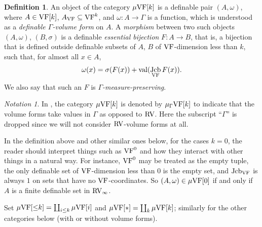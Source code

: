 \documentclass[12pt]{amsart}
\newcommand{\memph}[1]{{\color{magenta}\emph{#1}}}
\theoremstyle{plain}
\theoremstyle{definition}
\newtheorem{defn}[thm]{Definition}
\theoremstyle{remark}
\newtheorem{nota}[thm]{Notation}
\numberwithin{equation}{section}
\theoremstyle{plain}
\newcommand{\VF}{\textup{VF}}
\newcommand{\RV}{\textup{RV}}
\DeclareMathOperator{\jcb}{Jcb}
\newcommand{\0}{\emptyset}
\newcommand{\fun}{\longrightarrow}
\newcommand{\sub}{\subseteq}
\newcommand{\mVF}{{\mu}{\VF}}
\newcommand{\mgVF}{{\mu} {\VF}}
\DeclareMathOperator{\vv}{val}
\begin{document}
 \begin{defn}
\label{defn:VF:mu:G}
An object of the category $\mgVF[k]$ is a definable pair $(A, \omega)$, where $A \in \VF[k]$, $A_{\VF} \sub \VF^k$, and $\omega : A \fun \Gamma$ is a function, which is understood as a \memph{definable $\Gamma$-volume form} on $A$. A \memph{morphism} between two such objects $(A, \omega)$, $(B, \sigma)$ is a definable \memph{essential bijection} $F : A \fun B$, that is, a bijection that is defined outside definable subsets of $A$, $B$ of $\VF$-dimension less than $k$, such that, for almost all $x \in A$,
\begin{equation}\label{cond:mg}
\omega(x) = \sigma(F(x)) + \vv(\jcb_{\VF} F(x)).
\end{equation}
We also say that such an $F$ is \memph{$\Gamma$-measure-preserving}.
\end{defn}

\begin{nota}
In \cite{hrushovski:kazhdan:integration:vf}, the category $\mgVF[k]$ is denoted by ${\mu_{\Gamma}}{\VF[k]}$ to indicate that the volume forms take values in $\Gamma$ as opposed to $\RV$. Here the subscript ``$\Gamma$'' is dropped since  we will not consider $\RV$-volume forms at all.
\end{nota}

In the definition above and other similar ones below, for the cases $k =0$, the reader should interpret things such as $\VF^0$ and how they interact with other things in a natural way. For instance, $\VF^0$ may be treated as the empty tuple, the only definable set of $\VF$-dimension less than $0$ is the empty set, and $\jcb_{\VF}$ is always $1$ on sets that have no $\VF$-coordinates. So $(A, \omega) \in \mgVF[0]$ if and only if $A$ is a finite definable set in $\RV_\infty$.

Set $\mgVF[{\leq} k] = \coprod_{i \leq k} \mgVF[i]$ and $\mgVF[*] = \coprod_{k} \mVF[k]$; similarly for the other categories below (with or without volume forms).
\end{document}
